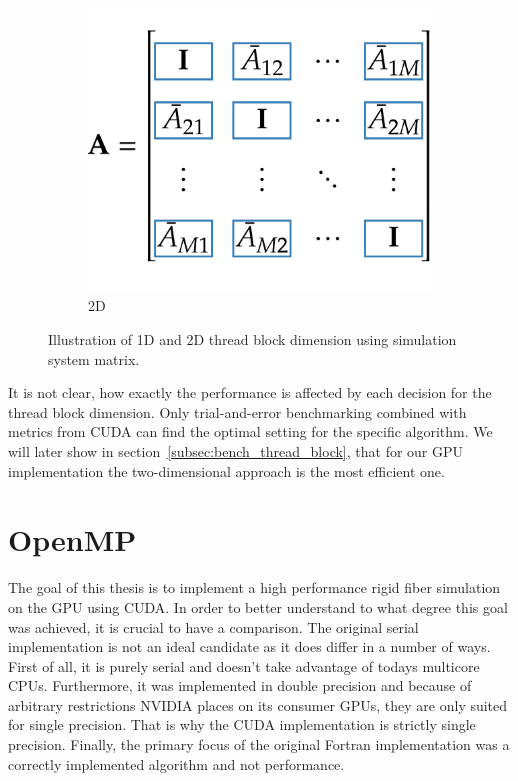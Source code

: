 \begin{figure}[!htbp]
\begin{subfigure}[h]{0.33\textwidth}
    \includegraphics[width=\textwidth]{img/thread_block2D.pdf}
    \caption{2D}\label{fig:thread_block_2D}
  \end{subfigure}
  \caption{Illustration of 1D and 2D thread block dimension using simulation system matrix.}
  \label{fig:thread_block}
\end{figure}

It is not clear, how exactly the performance is affected by each decision for the thread block dimension. Only trial-and-error benchmarking combined with metrics from CUDA can find the optimal setting for the specific algorithm. We will later show in section~\ref{subsec:bench_thread_block}, that for our GPU implementation the two-dimensional approach is the most efficient one.

\section{OpenMP}

The goal of this thesis is to implement a high performance rigid fiber simulation on the GPU using CUDA. In order to better understand to what degree this goal was achieved, it is crucial to have a comparison. The original serial implementation is not an ideal candidate as it does differ in a number of ways. First of all, it is purely serial and doesn't take advantage of todays multicore CPUs. Furthermore, it was implemented in double precision and because of arbitrary restrictions NVIDIA places on its consumer GPUs, they are only suited for single precision. That is why the CUDA implementation is strictly single precision. Finally, the primary focus of the original Fortran implementation was a correctly implemented algorithm and not performance.

